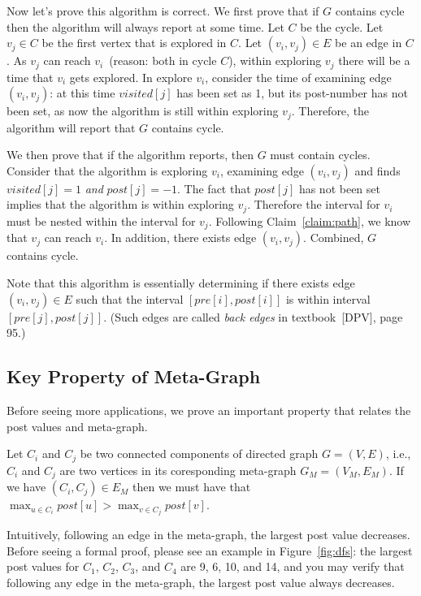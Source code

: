 Now let's prove this algorithm is correct.
We first prove that if $G$ contains cycle then the algorithm will always report at some time.
Let $C$ be the cycle.
Let $v_j \in C$ be the first vertex that is explored in $C$.
Let $(v_i, v_j) \in E$ be an edge in $C$.
As $v_j$ can reach $v_i$~(reason: both in cycle $C$), 
within exploring $v_j$ there will be a time that $v_i$ gets explored.
In explore $v_i$, consider the time of examining edge $(v_i,v_j)$: at this time $visited[j]$ has been set as 1,
but its post-number has not been set, as now the algorithm is still within exploring $v_j$.
Therefore, the algorithm will report that $G$ contains cycle. 

We then prove that if the algorithm reports, then $G$ must contain cycles.
Consider that the algorithm is exploring $v_i$, examining edge $(v_i, v_j)$ and 
finds $visited[j] = 1$ \emph{and} $post[j] = -1$.
The fact that $post[j]$ has not been set implies that the algorithm is within exploring $v_j$.
Therefore the interval for $v_i$ must be nested within the interval for $v_j$.
Following Claim~\ref{claim:path}, we know that $v_j$ can reach $v_i$.
In addition, there exists edge $(v_i, v_j)$. Combined, $G$ contains cycle.

Note that this algorithm is essentially determining if there exists edge $(v_i, v_j) \in E$
such that the interval $[pre[i], post[i]]$ is within interval $[pre[j], post[j]]$.
(Such edges are called \emph{back edges} in textbook~[DPV], page 95.)

\subsection*{Key Property of Meta-Graph}

Before seeing more applications, we prove an important property that relates the
post values and meta-graph.

\begin{claim}
Let $C_i$ and $C_j$ be two connected components of directed graph $G = (V, E)$, i.e., $C_i$ and $C_j$ are two
vertices in its coresponding meta-graph $G_M = (V_M, E_M)$. If we have $(C_i, C_j) \in E_M$ then
we must have that $\max_{u\in C_i} post[u] > \max_{v\in C_j} post[v]$.
\end{claim}

Intuitively, following an edge in the meta-graph, the largest post value decreases.
Before seeing a formal proof, please see an example in Figure~\ref{fig:dfs}:
the largest post values for $C_1$, $C_2$, $C_3$, and $C_4$ are 9, 6, 10, and 14,
and you may verify that following any edge in the meta-graph, the largest post value always decreases.

